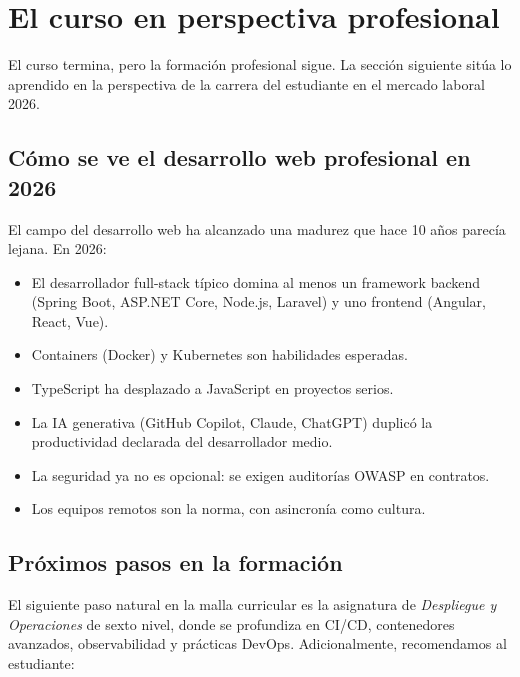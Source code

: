 \documentclass[11pt,a4paper,openany]{book}
\begin{document}
\section{El curso en perspectiva profesional}

El curso termina, pero la formación profesional sigue. La
sección siguiente sitúa lo aprendido en la perspectiva de la
carrera del estudiante en el mercado laboral 2026.


\subsection{Cómo se ve el desarrollo web profesional en 2026}

El campo del desarrollo web ha alcanzado una madurez que hace 10
años parecía lejana. En 2026:

\begin{itemize}
\item El desarrollador full-stack típico domina al menos un framework
backend (Spring Boot, ASP.NET Core, Node.js, Laravel) y uno frontend
(Angular, React, Vue).
\item Containers (Docker) y Kubernetes son habilidades esperadas.
\item TypeScript ha desplazado a JavaScript en proyectos serios.
\item La IA generativa (GitHub Copilot, Claude, ChatGPT) duplicó la
productividad declarada del desarrollador medio.
\item La seguridad ya no es opcional: se exigen auditorías OWASP en
contratos.
\item Los equipos remotos son la norma, con asincronía como cultura.
\end{itemize}

\subsection{Próximos pasos en la formación}

El siguiente paso natural en la malla curricular es la asignatura de
\emph{Despliegue y Operaciones} de sexto nivel, donde se profundiza
en CI/CD, contenedores avanzados, observabilidad y prácticas DevOps.
Adicionalmente, recomendamos al estudiante:
\end{document}
